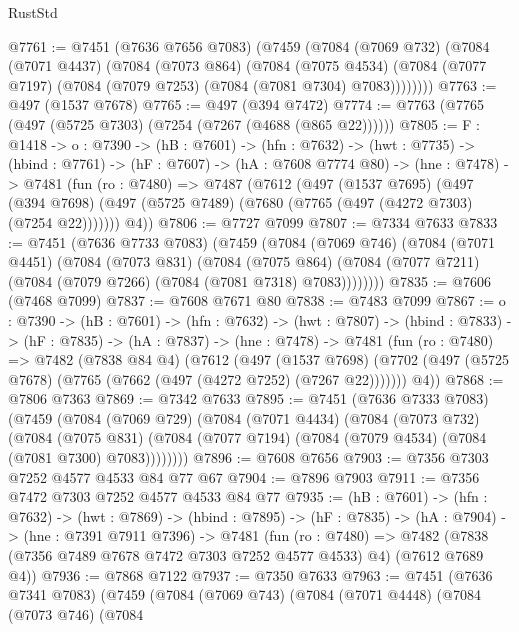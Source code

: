 \begin{lexlean}{RustStd}
\begin{coremodule}
@7761 := @7451
    (@7636 @7656 @7083)
    (@7459
      (@7084
        (@7069 @732)
        (@7084
          (@7071 @4437)
          (@7084
            (@7073 @864)
            (@7084
              (@7075 @4534)
              (@7084 (@7077 @7197) (@7084 (@7079 @7253) (@7084 (@7081 @7304) @7083))))))))
@7763 := @497 (@1537 @7678)
@7765 := @497 (@394 @7472)
@7774 := @7763 (@7765 (@497 (@5725 @7303) (@7254 (@7267 (@4688 (@865 @22))))))
@7805 := {F : @1418} ->
  {o : @7390} ->
  (hB : @7601) ->
  (hfn : @7632) ->
  (hwt : @7735) ->
  (hbind : @7761) ->
  (hF : @7607) ->
  (hA : @7608 @7774 @80) ->
  (hne : @7478) ->
  @7481
    (fun (ro : @7480) =>
    @7487
      (@7612
        (@497
          (@1537 @7695)
          (@497 (@394 @7698) (@497 (@5725 @7489) (@7680 (@7765 (@497 (@4272 @7303) (@7254 @22)))))))
        @4))
@7806 := @7727 @7099
@7807 := @7334 @7633
@7833 := @7451
    (@7636 @7733 @7083)
    (@7459
      (@7084
        (@7069 @746)
        (@7084
          (@7071 @4451)
          (@7084
            (@7073 @831)
            (@7084
              (@7075 @864)
              (@7084 (@7077 @7211) (@7084 (@7079 @7266) (@7084 (@7081 @7318) @7083))))))))
@7835 := @7606 (@7468 @7099)
@7837 := @7608 @7671 @80
@7838 := @7483 @7099
@7867 := {o : @7390} ->
  (hB : @7601) ->
  (hfn : @7632) ->
  (hwt : @7807) ->
  (hbind : @7833) ->
  (hF : @7835) ->
  (hA : @7837) ->
  (hne : @7478) ->
  @7481
    (fun (ro : @7480) =>
    @7482
      (@7838 @84 @4)
      (@7612
        (@497
          (@1537 @7698)
          (@7702 (@497 (@5725 @7678) (@7765 (@7662 (@497 (@4272 @7252) (@7267 @22)))))))
        @4))
@7868 := @7806 @7363
@7869 := @7342 @7633
@7895 := @7451
    (@7636 @7333 @7083)
    (@7459
      (@7084
        (@7069 @729)
        (@7084
          (@7071 @4434)
          (@7084
            (@7073 @732)
            (@7084
              (@7075 @831)
              (@7084 (@7077 @7194) (@7084 (@7079 @4534) (@7084 (@7081 @7300) @7083))))))))
@7896 := @7608 @7656
@7903 := @7356 @7303 @7252 @4577 @4533 @84 @77 @67
@7904 := @7896 @7903
@7911 := @7356 @7472 @7303 @7252 @4577 @4533 @84 @77
@7935 := (hB : @7601) ->
  (hfn : @7632) ->
  (hwt : @7869) ->
  (hbind : @7895) ->
  (hF : @7835) ->
  (hA : @7904) ->
  (hne : @7391 @7911 @7396) ->
  @7481
    (fun (ro : @7480) =>
    @7482 (@7838 (@7356 @7489 @7678 @7472 @7303 @7252 @4577 @4533) @4) (@7612 @7689 @4))
@7936 := @7868 @7122
@7937 := @7350 @7633
@7963 := @7451
    (@7636 @7341 @7083)
    (@7459
      (@7084
        (@7069 @743)
        (@7084
          (@7071 @4448)
          (@7084
            (@7073 @746)
            (@7084

\end{coremodule}
\end{lexlean}
